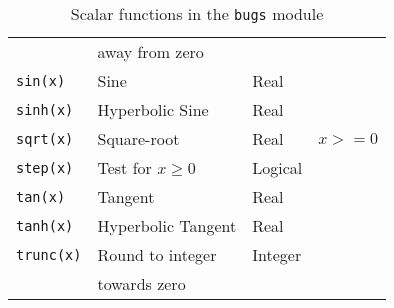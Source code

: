 \documentclass[11pt, a4paper, titlepage]{report}
\begin{document}
\begin{table}
\begin{center}
\begin{tabular}{llll}
                    & away from zero      &      & \\
\verb+sin(x)+       & Sine                & Real & \\
\verb+sinh(x)+      & Hyperbolic Sine     & Real & \\
\verb+sqrt(x)+      & Square-root         & Real & $x >= 0$ \\
\verb+step(x)+      & Test for $x \geq 0$ & Logical & \\
\verb+tan(x)+       & Tangent             & Real & \\
\verb+tanh(x)+      & Hyperbolic Tangent  & Real & \\
\verb+trunc(x)+     & Round to integer    & Integer & \\
                    & towards zero        & \\
\hline
\end{tabular}
\caption{Scalar functions in the \texttt{bugs} module \label{table:bugs:scalar}}
\end{center}
\end{table}
\end{document}
